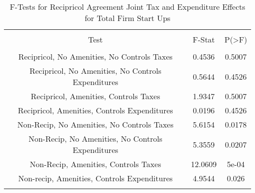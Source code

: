 
\begin{table}[!htbp] \centering 
  \caption{F-Tests for Recipricol Agreement Joint Tax and Expenditure Effects for Total Firm Start Ups} 
  \label{--Ftests} 
\begin{tabular}{@{\extracolsep{5pt}} ccc} 
\\[-1.8ex]\hline 
\hline \\[-1.8ex] 
Test & F-Stat & P(\textgreater F) \\ 
\hline \\[-1.8ex] 
Recipricol, No Amenities, No Controls Taxes & 0.4536 & 0.5007 \\ 
Recipricol, No Amenities, No Controls Expenditures & 0.5644 & 0.4526 \\ 
Recipricol, Amenities, Controls Taxes & 1.9347 & 0.5007 \\ 
Recipricol, Amenities, Controls Expenditures & 0.0196 & 0.4526 \\ 
Non-Recip, No Amenities, No Controls Taxes & 5.6154 & 0.0178 \\ 
Non-Recip, No Amenities, No Controls Expenditures & 5.3559 & 0.0207 \\ 
Non-Recip, Amenities, Controls Taxes & 12.0609 & 5e-04 \\ 
Non-recip, Amenities, Controls Expenditures & 4.9544 & 0.026 \\ 
\hline \\[-1.8ex] 
\end{tabular} 
\end{table} 
